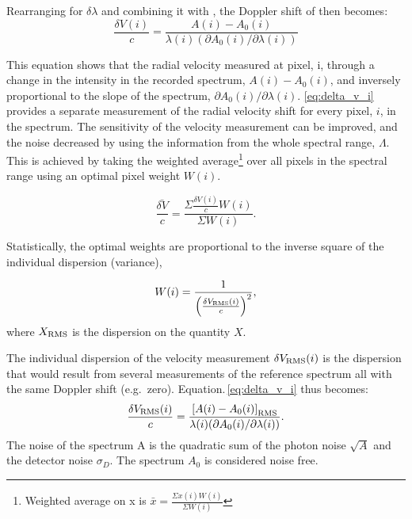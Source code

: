 Rearranging  for \(\delta \lambda\) and combining it with , the Doppler shift of then becomes:
\begin{equation}
    \frac{\delta V(i)}{c} = \frac{A(i) - A_0(i) }{\lambda(i) (\partial A_0(i)/\partial \lambda(i))} \label{eq:delta_v_i}
\end{equation}

This equation shows that the radial velocity measured at pixel, i, through a change in the intensity in the recorded spectrum, \(A(i)-A_0(i)\), and inversely proportional to the slope of the spectrum, \({\partial A_0(i)}/{\partial \lambda(i)}\).
\ref{eq:delta_v_i} provides a separate measurement of the radial velocity shift for every pixel, $i$, in the spectrum. The sensitivity of the velocity measurement can be improved, and the noise decreased by using the information from the whole  spectral range, \(\Lambda\). This is achieved by taking the weighted average\footnote{Weighted average on x is \(\bar{x} = \frac{\Sigma{ x(i)W(i)}}{\Sigma {W(i)}}\)} over all pixels in the spectral range using an optimal pixel weight \(W(i)\).

\begin{equation}
\bar{\frac{\delta V}{c}} = \frac{\Sigma{\frac{\delta V(i)}{c}W(i)}}{\Sigma {W(i)}}.
\end{equation}

Statistically, the optimal weights are proportional to the inverse square of the individual dispersion (variance),

\begin{equation}
W(i) = \frac{1}{{\left(\frac{\delta V_{\textrm{RMS}}(i)}{c}\right)}^{2}}, \label{eq:weights}
\end{equation}
where \(X_{\textrm{RMS}}\) is the dispersion on the quantity \(X\).


The individual dispersion of the velocity measurement \(\delta V_{\textrm{RMS}}(i)\) is the dispersion that would result from several measurements of the reference spectrum all with the same Doppler shift (e.g.\ zero). Equation.\,\ref{eq:delta_v_i} thus becomes:
\begin{equation}
    \frac{\delta V_{\textrm{RMS}}(i)}{c} = \frac{{[A(i) - A_0(i)]}_{\textrm{RMS}} }{\lambda(i) (\partial A_0(i)/\partial \lambda(i))}. \label{eq:delta_v_i_rms}
\end{equation}
The noise of the spectrum A is the quadratic sum of the photon noise \(\sqrt{A}\) and the detector noise \(\sigma_D\). The spectrum \(A_0\) is considered noise free.

